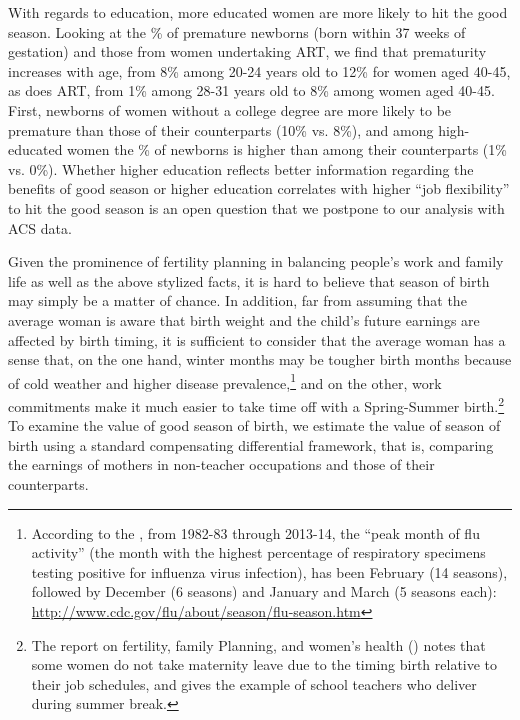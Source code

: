 \documentclass[a4paper, 12 pt]{article}
\theoremstyle{plain}
\begin{document}
\begin{doublespace}
With regards to education, more educated women are more likely to hit the good season. Looking at the \% of premature newborns (born within 37 weeks of gestation) and those from women undertaking ART, we find that prematurity increases with age, from 8\% among 20-24 years old to 12\% for women aged 40-45, as does ART, from 1\% among 28-31 years old to 8\% among women aged 40-45. First, newborns of women without a college degree are more likely to be premature than those of their counterparts (10\% vs. 8\%), and among high-educated women the \% of newborns is higher than among their counterparts (1\% vs. 0\%). Whether higher education reflects better information regarding the benefits of good season or higher education correlates with higher ``job flexibility'' to hit the good season is an open question that we postpone to our analysis with ACS data.

Given the prominence of fertility planning in balancing people's work and family life as well as the above stylized facts, it is hard to believe that season of birth may simply be a matter of chance. In addition, far from assuming that the average woman is aware that birth weight and the child's future earnings are affected by birth timing, it is sufficient to consider that the average woman has a sense that, on the one hand, winter months may be tougher birth months because of cold weather and higher disease prevalence,\footnote{According to the \citet{CDC2014}, from 1982-83 through 2013-14, the ``peak month of flu activity'' (the month with the highest percentage of respiratory specimens testing positive for influenza virus infection), has been February (14 seasons), followed by December (6 seasons) and January and March (5 seasons each): \href{http://www.cdc.gov/flu/about/season/flu-season.htm}{http://www.cdc.gov/flu/about/season/flu-season.htm}} and on the other, work commitments make it much easier to take time off with a Spring-Summer birth.\footnote{The report on fertility, family Planning, and women's health (\citealp{CDC1997}) notes that some women do not take maternity leave due to the timing birth relative to their job schedules, and gives the example of school teachers who deliver during summer break.}
To examine the value of good season of birth, we estimate the value of season of birth using a standard compensating differential framework, that is, comparing the earnings of mothers in non-teacher occupations and those of their counterparts.


\end{doublespace}
\end{document}
